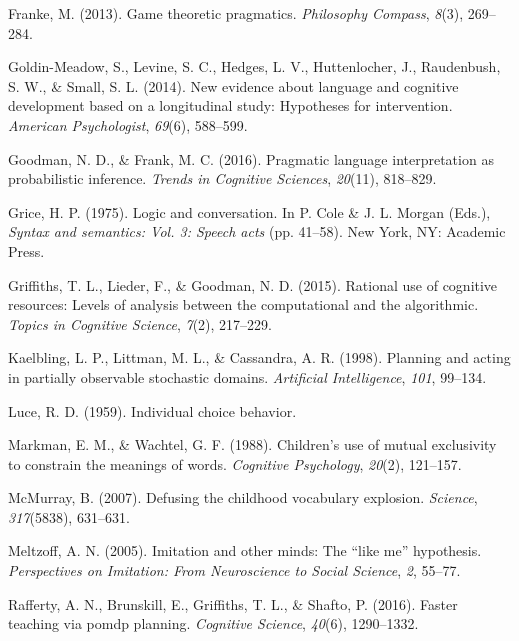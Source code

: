 \documentclass[english,,man,floatsintext]{apa6}
\begin{document}
\leavevmode\hypertarget{ref-franke2013}{}%
Franke, M. (2013). Game theoretic pragmatics. \emph{Philosophy Compass}, \emph{8}(3), 269--284.

\leavevmode\hypertarget{ref-goldin-meadow2014}{}%
Goldin-Meadow, S., Levine, S. C., Hedges, L. V., Huttenlocher, J., Raudenbush, S. W., \& Small, S. L. (2014). New evidence about language and cognitive development based on a longitudinal study: Hypotheses for intervention. \emph{American Psychologist}, \emph{69}(6), 588--599.

\leavevmode\hypertarget{ref-goodman2016}{}%
Goodman, N. D., \& Frank, M. C. (2016). Pragmatic language interpretation as probabilistic inference. \emph{Trends in Cognitive Sciences}, \emph{20}(11), 818--829.

\leavevmode\hypertarget{ref-grice1975}{}%
Grice, H. P. (1975). Logic and conversation. In P. Cole \& J. L. Morgan (Eds.), \emph{Syntax and semantics: Vol. 3: Speech acts} (pp. 41--58). New York, NY: Academic Press.

\leavevmode\hypertarget{ref-griffiths2015}{}%
Griffiths, T. L., Lieder, F., \& Goodman, N. D. (2015). Rational use of cognitive resources: Levels of analysis between the computational and the algorithmic. \emph{Topics in Cognitive Science}, \emph{7}(2), 217--229.

\leavevmode\hypertarget{ref-kaelbling1998}{}%
Kaelbling, L. P., Littman, M. L., \& Cassandra, A. R. (1998). Planning and acting in partially observable stochastic domains. \emph{Artificial Intelligence}, \emph{101}, 99--134.

\leavevmode\hypertarget{ref-luce1959}{}%
Luce, R. D. (1959). Individual choice behavior.

\leavevmode\hypertarget{ref-markman1988}{}%
Markman, E. M., \& Wachtel, G. F. (1988). Children's use of mutual exclusivity to constrain the meanings of words. \emph{Cognitive Psychology}, \emph{20}(2), 121--157.

\leavevmode\hypertarget{ref-mcmurray2007}{}%
McMurray, B. (2007). Defusing the childhood vocabulary explosion. \emph{Science}, \emph{317}(5838), 631--631.

\leavevmode\hypertarget{ref-meltzoff2005}{}%
Meltzoff, A. N. (2005). Imitation and other minds: The ``like me'' hypothesis. \emph{Perspectives on Imitation: From Neuroscience to Social Science}, \emph{2}, 55--77.

\leavevmode\hypertarget{ref-rafferty2016}{}%
Rafferty, A. N., Brunskill, E., Griffiths, T. L., \& Shafto, P. (2016). Faster teaching via pomdp planning. \emph{Cognitive Science}, \emph{40}(6), 1290--1332.
\end{document}
